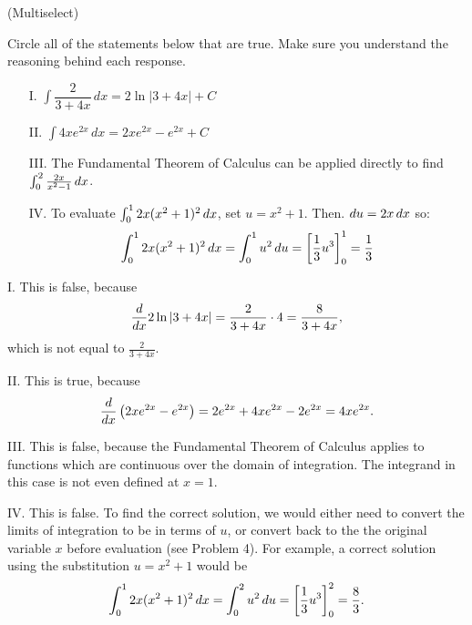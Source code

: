 \documentclass[handout]{ximera}
\begin{document}
\begin{problem}
(Multiselect)

Circle all of the statements below that are true.  Make sure you understand the reasoning behind each response.

\begin{itemize}
\item[I.] $\displaystyle \int \dfrac{2}{3+4x} \, dx = 2\ln|3+4x|+C$

\item[II.] $\displaystyle \int 4xe^{2x} \, dx = 2xe^{2x}-e^{2x}+C$

\item[III.] The Fundamental Theorem of Calculus can be applied directly to find $ \int_0^2 \frac{2x}{x^2-1} \mathop{}\!d x$.

\item[IV.] To evaluate $ \int_0^1 2x(x^2+1)^2 \mathop{}\!d x$, set $u=x^2+1$.  Then. $\mathop{}\!d u = 2x \mathop{}\!d x$ so:
\[ \int_0^1 2x(x^2+1)^2 \mathop{}\!d x = \int_0^1 u^2 \mathop{}\!d u = \bigg[ \frac{1}{3} u^3 \bigg]_0^1 = \frac{1}{3}\]
\end{itemize}

\end{problem}

\begin{freeResponse} I. This is false, because
$$
\frac{\mathop{}\!d}{\mathop{}\!d x} 2 \ln |3+4x| = \frac{2}{3+4x} \cdot 4 = \frac{8}{3+4x},
$$
which is not equal to $\frac{2}{3+4x}$. 

II. This is true, because
$$
\frac{\mathop{}\!d}{\mathop{}\!d x} \left( 2xe^{2x}-e^{2x}\right) = 2 e^{2x} + 4x e^{2x} - 2 e^{2x} = 4x e^{2x}.
$$

III. This is false, because the Fundamental Theorem of Calculus applies to functions which are continuous over the domain of integration. The integrand in this case is not even defined at $x=1$. 

IV. This is false. To find the correct solution, we would either need to convert the limits of integration to be in terms of $u$, or convert back to the the original variable $x$ before evaluation (see Problem 4). For example, a correct solution using the substitution $u = x^2 +1 $ would be 
$$
\int_0^1 2x(x^2+1)^2 \mathop{}\!d x = \int_0^2 u^2 \mathop{}\!d u = \bigg[ \frac{1}{3} u^3 \bigg]_0^2 = \frac{8}{3}.
$$
\end{freeResponse}
\end{document}
